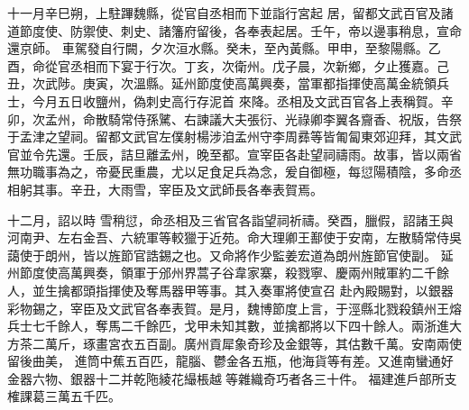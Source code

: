 \begin{pinyinscope}
十一月辛巳朔，上駐蹕魏縣，從官自丞相而下並詣行宮起
 居，留都文武百官及諸道節度使、防禦使、刺史、諸籓府留後，各奉表起居。壬午，帝以邊事稍息，宣命還京師。
 車駕發自行闕，夕次洹水縣。癸未，至內黃縣。甲申，至黎陽縣。乙酉，命從官丞相而下宴于行次。丁亥，次衛州。戊子晨，次新鄉，夕止獲嘉。己丑，次武陟。庚寅，次溫縣。延州節度使高萬興奏，當軍都指揮使高萬金統領兵士，今月五日收鹽州，偽刺史高行存泥首
 來降。丞相及文武百官各上表稱賀。辛卯，次孟州，命散騎常侍孫騭、右諫議大夫張衍、光祿卿李翼各齎香、祝版，告祭于孟津之望祠。留都文武官左僕射楊涉洎孟州守李周彞等皆匍匐東郊迎拜，其文武官並令先還。壬辰，詰旦離孟州，晚至都。宣宰臣各赴望祠禱雨。故事，皆以兩省無功職事為之，帝憂民重農，尤以足食足兵為念，爰自御極，每愆陽積陰，多命丞相躬其事。辛丑，大雨雪，宰臣及文武師長各奉表賀焉。


十二月，詔以時
 雪稍愆，命丞相及三省官各詣望祠祈禱。癸酉，臘假，詔諸王與河南尹、左右金吾、六統軍等較獵于近苑。命大理卿王鄯使于安南，左散騎常侍吳藹使于朗州，皆以旌節官誥錫之也。又命將作少監姜宏道為朗州旌節官使副。
 延州節度使高萬興奏，領軍于邠州界蒿子谷韋家寨，殺戮寧、慶兩州賊軍約二千餘人，並生擒都頭指揮使及奪馬器甲等事。其入奏軍將使宣召
 赴內殿賜對，以銀器彩物錫之，宰臣及文武官各奉表賀。是月，魏博節度上言，于涇縣北戮殺鎮州王熔兵士七千餘人，奪馬二千餘匹，戈甲未知其數，並擒都將以下四十餘人。兩浙進大方茶二萬斤，琢畫宮衣五百副。廣州貢犀象奇珍及金銀等，其估數千萬。安南兩使留後曲美，
 進筒中蕉五百匹，龍腦、鬱金各五瓶，他海貨等有差。又進南蠻通好金器六物、銀器十二并乾陁綾花繓棖越𣭻等雜織奇巧者各三十件。
 福建進戶部所支榷課葛三萬五千匹。



\end{pinyinscope}